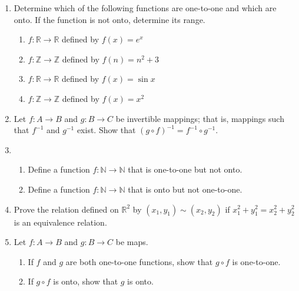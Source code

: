 {\begin{enumerate}
\item
Determine which of the following functions are one-to-one and which are onto.  If the function is not onto, determine its range.
\begin{enumerate} 
 
\item
$f: {\mathbb R} \rightarrow {\mathbb R}$ defined by $f(x) = e^x$
 
\item
$f: {\mathbb Z} \rightarrow {\mathbb Z}$ defined by $f(n) = n^2 + 3$
  
\item
$f: {\mathbb R} \rightarrow {\mathbb R}$ defined by $f(x) = \sin x$
 
\item
$f: {\mathbb Z} \rightarrow {\mathbb Z}$ defined by $f(x) = x^2$
 
\end{enumerate}
 
\item
Let $f :A \rightarrow B$ and $g : B \rightarrow C$ be invertible mappings; that is, mappings such that $f^{-1}$ and $g^{-1}$ exist.  Show that $(g \circ f)^{-1} =f^{-1} \circ g^{-1}$. 

\item
\begin{enumerate}
  
\item
Define a function $f: {\mathbb N} \rightarrow {\mathbb N}$ that is one-to-one but not onto. 
 
\item
Define a function $f: {\mathbb N} \rightarrow {\mathbb N}$ that is onto but not one-to-one. 
 
\end{enumerate}
 
\item
Prove the relation defined on ${\mathbb R}^2$ by $(x_1, y_1 ) \sim (x_2, y_2)$ if $x_1^2 + y_1^2 = x_2^2 + y_2^2$ is  an equivalence relation. 
 
\item
Let $f : A \rightarrow B$ and $g : B \rightarrow C$ be maps.
\begin{enumerate}
 
\item
If $f$ and $g$ are both one-to-one functions, show that $g \circ f$
is one-to-one. 
 
\item
If $g \circ f$ is onto, show that $g$ is onto.
 

\end{enumerate}
\end{enumerate}}
